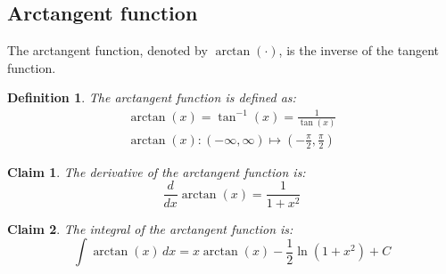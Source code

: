 \documentclass[11pt]{book} %
\newtheorem{definition}{Definition}[section]
\newtheorem*{claim*}{Claim}
\begin{document}
\subsection{Arctangent function}
The arctangent function, denoted by \(\arctan(\cdot)\), is the inverse of the tangent function.

\begin{definition}
    The arctangent function is defined as:
    \begin{align*}
        \arctan(x) = \tan^{-1}(x) = \frac{1}{\tan(x)} \\
        \arctan(x) : \left(-\infty, \infty\right) \mapsto \left(-\frac{\pi}{2}, \frac{\pi}{2}\right)
    \end{align*}
\end{definition}

\begin{claim*}
    The derivative of the arctangent function is:
    \begin{equation}
        \frac{d}{dx} \arctan(x) = \frac{1}{1 + x^2}
    \end{equation}
\end{claim*}

\begin{claim*}
    The integral of the arctangent function is:
    \begin{equation}
        \int \arctan(x) \, dx = x \arctan(x) - \frac{1}{2} \ln(1 + x^2) + C
    \end{equation}
\end{claim*}
\end{document}
